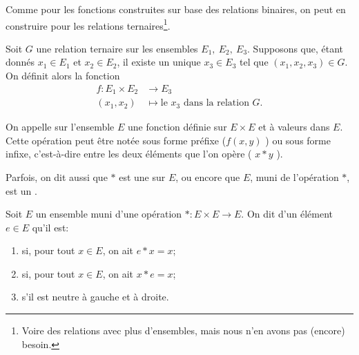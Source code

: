 \begin{normaltext}	\label{NORMooRelationsTernaires}
	Comme pour les fonctions construites sur base des relations binaires, on peut en construire pour les relations ternaires\footnote{Voire des relations avec plus d'ensembles, mais nous n'en avons pas (encore) besoin.}.
\end{normaltext}

\begin{normaltext}	\label{NORMooFonctionDeuxVariables}
	Soit \( G \) une relation ternaire sur les ensembles  \( E_1,\ E_2, \ E_3 \). Supposons que, étant donnés \(x_1 \in E_1 \) et \(x_2 \in E_2 \), il existe un unique \(x_3 \in E_3 \) tel que \( (x_1, x_2, x_3) \in G \). On définit alors la fonction
	\begin{equation}
		\begin{aligned}
			f\colon E_1 \times E_2 & \to E_3                                          \\
			(x_1, x_2)             & \mapsto \text{le }x_3\text{ dans la relation }G.
		\end{aligned}
	\end{equation}
\end{normaltext}

\begin{definition}  \label{DEFooOperation}
	On appelle  sur l'ensemble \( E \) une fonction définie sur \( E \times E \) et à valeurs dans  \( E \). Cette opération peut être notée sous forme préfixe (\( f(x, y) \) ) ou sous forme infixe, c'est-à-dire entre les deux éléments que l'on opère ( \( x * y \) ).

	Parfois, on dit aussi que \( * \) est une  sur \( E \), ou encore que \( E \), muni de l'opération \( * \), est un .
\end{definition}

\begin{definition}	\label{DEFooMagmaNeutre}
	Soit \( E \) un ensemble muni d'une opération \( *\colon E\times E\to E\). On dit d'un élément \( e \in E \) qu'il est:
	\begin{enumerate}
		\item
		       si, pour tout \( x \in E \), on ait \( e*x = x \);
		\item
		       si, pour tout \( x \in E \), on ait \( x*e = x \);
		\item
		       s'il est neutre à gauche et à droite.
	\end{enumerate}
\end{definition}

